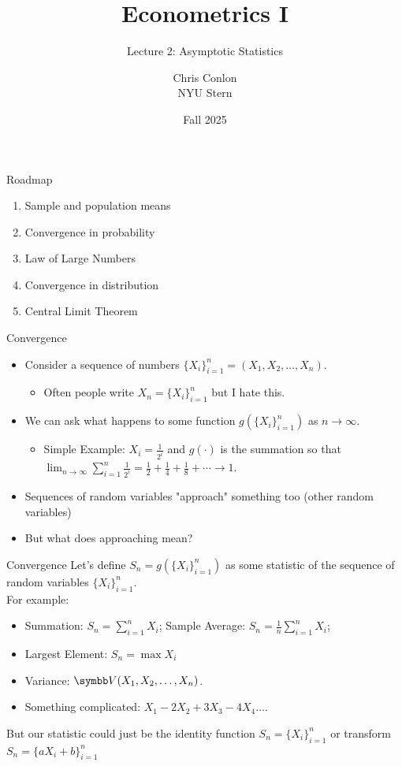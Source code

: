 \documentclass[aspectratio=169,11pt]{beamer}
\title{Econometrics I}
\subtitle{Lecture 2: Asymptotic Statistics}
\author{Chris Conlon \\NYU Stern}
\date{Fall 2025}
\begin{document}
\maketitle


\begin{frame}{Roadmap}
\begin{enumerate}
	\item Sample and population means
	\item Convergence in probability
	\item Law of Large Numbers
	\item Convergence in distribution
	\item Central Limit Theorem
\end{enumerate}
\end{frame}

\begin{frame}{Convergence}
\begin{itemize}
	\item Consider a sequence of numbers $\{X_i\}_{i=1}^n = \left(X_1,X_2,\ldots,X_n\right)$.
	\begin{itemize}
		\item Often people write $X_n =  \{X_i\}_{i=1}^n$ but I hate this.
	\end{itemize}
	\item We can ask what happens to some function $g(\{X_i\}_{i=1}^n)$ as $n \rightarrow \infty$.
	\begin{itemize}
		\item Simple Example: $X_i = \frac{1}{2^i}$ and $g(\cdot)$ is the summation so that $\lim_{n \rightarrow \infty}\sum_{i=1}^n \frac{1}{2^i} =  \frac{1}{2} + \frac{1}{4} + \frac{1}{8} + \cdots \rightarrow 1$.
	\end{itemize}
	\item Sequences of \alert{random variables} "approach" something too (other \alert{random variables})
	\item But what does \alert{approaching} mean?
\end{itemize}
\end{frame}

\begin{frame}{Convergence}
Let's define $S_n = g( \{X_i\}_{i=1}^n)$ as some \alert{statistic} of the sequence of random variables $\{X_i\}_{i=1}^n$.\\
 For example:
\begin{itemize}
	\item Summation: $S_n = \sum_{i=1}^n X_i$; Sample Average: $S_n = \frac{1}{n}\sum_{i=1}^n X_i$;
	\item Largest Element: $S_n = \max  X_i$
	\item Variance: $\Var(X_1,X_2,\ldots,X_n)$.
	\item Something complicated: $X_1 - 2 X_2 + 3 X_3 - 4 X_4 \ldots$.
\end{itemize}
But our statistic could just be the identity function $S_n = \{X_i\}_{i=1}^n$ or transform $S_n = \{a X_i +b\}_{i=1}^n$ 
\end{frame}
\end{document}
